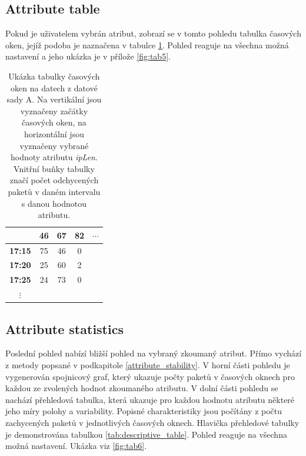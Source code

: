 \subsection*{Attribute table}

Pokud je uživatelem vybrán atribut, zobrazí se v tomto pohledu tabulka časových oken, jejíž podoba je naznačena v tabulce \ref{tab:attribute_table}. Pohled reaguje na všechna možná nastavení a jeho ukázka je v přílože \ref{fig:tab5}.

\begin{table}[H]
\centering
\renewcommand{\arraystretch}{1.5}
\begin{tabular}{|c|c|c|c|c|}
\hline
               & \textbf{46} & \textbf{67} & \textbf{82} & $\cdots$ \\ \hline
\textbf{17:15} & 75          & 46          & 0           &     \\ \hline
\textbf{17:20} & 25          & 60          & 2           &     \\ \hline
\textbf{17:25} & 24          & 73          & 0           &     \\ \hline
$\vdots$            &             &             &             &     \\ \hline
\end{tabular}
\renewcommand{\arraystretch}{1}
\caption{Ukázka tabulky časových oken na datech z datové sady A. Na vertikální  jsou vyznačeny začátky časových oken, na horizontální  jsou vyznačeny vybrané hodnoty atributu \emph{ipLen}. Vnitřní buňky tabulky značí počet odchycených paketů v daném intervalu s danou hodnotou atributu.}
\label{tab:attribute_table}
\end{table}

\subsection*{Attribute statistics}

Poslední pohled nabízí bližší pohled na vybraný zkoumaný atribut. Přímo vychází z metody popsané v podkapitole \ref{attribute_stability}. V horní části pohledu je vygenerován spojnicový graf, který ukazuje počty paketů v časových oknech pro každou ze zvolených hodnot zkoumaného atributu. V dolní části pohledu se nachází přehledová tabulka, která ukazuje pro každou hodnotu atributu některé jeho míry polohy a variability. Popisné charakteristiky jsou počítány z počtu zachycených paketů v jednotlivých časových oknech. Hlavička přehledové tabulky je demonstrována tabulkou \ref{tab:descriptive_table}. Pohled reaguje na všechna možná nastavení. Ukázka viz \ref{fig:tab6}.


